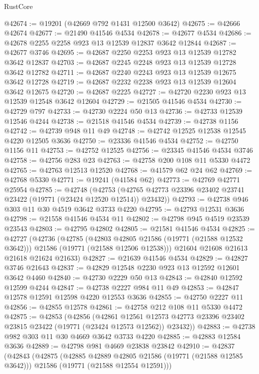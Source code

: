 \begin{lexlean}{RustCore}
\begin{coremodule}
@42674 := @19201 (@42669 @792 @1431 @12500 @3642)
@42675 := @42666 @42674
@42677 := @21490 @41546 @4534
@42678 := @42677 @4534
@42686 := @42678 @2255 @2258 @923 @13 @12539 @12837 @3642 @12844
@42687 := @42677 @3746
@42695 := @42687 @2250 @2253 @923 @13 @12539 @12782 @3642 @12837
@42703 := @42687 @2245 @2248 @923 @13 @12539 @12728 @3642 @12782
@42711 := @42687 @2240 @2243 @923 @13 @12539 @12675 @3642 @12728
@42719 := @42687 @2232 @2238 @923 @13 @12539 @12604 @3642 @12675
@42720 := @42687 @2225
@42727 := @42720 @2230 @923 @13 @12539 @12548 @3642 @12604
@42729 := @21505 @41546 @4534
@42730 := @42729 @797
@42733 := @42730 @2224 @50 @13
@42736 := @42733 @12539 @12546 @4244
@42738 := @21518 @41546 @4534
@42739 := @42738 @1156
@42742 := @42739 @948 @11 @49
@42748 := @42742 @12525 @12538 @12545 @4220 @12505 @3636
@42750 := @23336 @41546 @4534
@42752 := @42750 @1156 @11
@42753 := @42752 @12525
@42756 := @23345 @41546 @4534 @3746
@42758 := @42756 @283 @23
@42763 := @42758 @200 @108 @11 @5330 @4472
@42765 := @42763 @12513 @12520
@42768 := @41579 @62 @24 @62
@42769 := @42768 @5330
@42771 := @19241 (@41584 @62)
@42773 := @42769 @42771 @25954
@42785 := @42748
    (@42753 (@42765 @42773 @23396 @23402 @23741 @23422 (@19771 (@23424 @12520 @12514)) @23432))
@42793 := @42738 @946 @303 @11 @30 @4519 @3642 @3733 @4220
@42795 := @42793 @12531 @3636
@42798 := @21558 @41546 @4534 @11
@42802 := @42798 @945 @4519 @23539 @23543
@42803 := @42795 @42802
@42805 := @21581 @41546 @4534
@42825 := @42727
    (@42736
      (@42785
        (@42803 @42805 @21586 (@19771 (@21588 @12532 @3642)))
        @21586
        (@19771 (@21588 @12506 @12538)))
      @21604
      @21608
      @21613
      @21618
      @21624
      @21633)
@42827 := @21639 @41546 @4534
@42829 := @42827 @3746 @21643
@42837 := @42829 @12548 @2230 @923 @13 @12592 @12601 @3642 @4460
@42840 := @42730 @2229 @50 @13
@42843 := @42840 @12592 @12599 @4244
@42847 := @42738 @2227 @984 @11 @49
@42853 := @42847 @12578 @12591 @12598 @4220 @12553 @3636
@42855 := @42750 @2227 @11
@42856 := @42855 @12578
@42861 := @42758 @212 @108 @11 @5330 @4472
@42875 := @42853
    (@42856
      (@42861
        @12561
        @12573
        @42773
        @23396
        @23402
        @23815
        @23422
        (@19771 (@23424 @12573 @12562))
        @23432))
@42883 := @42738 @982 @303 @11 @30 @4669 @3642 @3733 @4220
@42885 := @42883 @12584 @3636
@42889 := @42798 @981 @4669 @23838 @23842
@42910 := @42837
    (@42843
      (@42875
        (@42885 @42889 @42805 @21586 (@19771 (@21588 @12585 @3642)))
        @21586
        (@19771 (@21588 @12554 @12591)))

\end{coremodule}
\end{lexlean}
